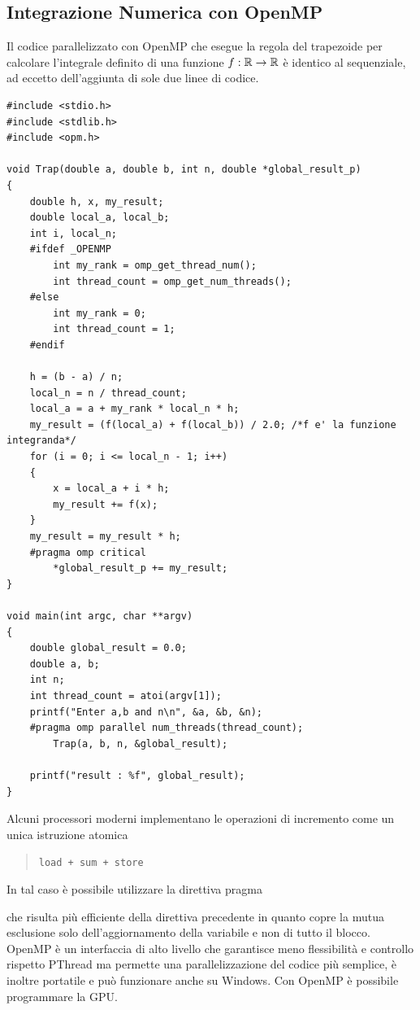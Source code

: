 \documentclass[10pt, letterpaper]{report}
\begin{document}
\subsection{Integrazione Numerica con OpenMP}
Il codice parallelizzato con OpenMP che esegue la regola del trapezoide per calcolare l'integrale definito di una funzione $f:{\mathbb R}\rightarrow {\mathbb R}$ è identico al sequenziale, ad eccetto dell'aggiunta di sole due linee di codice.
\begin{lstlisting}[style=CStyle]
#include <stdio.h>
#include <stdlib.h>
#include <opm.h>

void Trap(double a, double b, int n, double *global_result_p)
{
    double h, x, my_result;
    double local_a, local_b;
    int i, local_n;
    #ifdef _OPENMP
        int my_rank = omp_get_thread_num();
        int thread_count = omp_get_num_threads();
    #else
        int my_rank = 0;
        int thread_count = 1;
    #endif

    h = (b - a) / n;
    local_n = n / thread_count;
    local_a = a + my_rank * local_n * h;
    my_result = (f(local_a) + f(local_b)) / 2.0; /*f e' la funzione integranda*/
    for (i = 0; i <= local_n - 1; i++)
    {
        x = local_a + i * h;
        my_result += f(x);
    }
    my_result = my_result * h;
    #pragma omp critical
        *global_result_p += my_result;
}

void main(int argc, char **argv)
{
    double global_result = 0.0;
    double a, b;
    int n;
    int thread_count = atoi(argv[1]);
    printf("Enter a,b and n\n", &a, &b, &n);
    #pragma omp parallel num_threads(thread_count);
        Trap(a, b, n, &global_result);

    printf("result : %f", global_result);
}
\end{lstlisting}
Alcuni processori moderni implementano le operazioni di incremento come un unica istruzione atomica \begin{quote}
    \texttt{load + sum + store}
\end{quote}
In tal caso è possibile utilizzare la direttiva pragma \begin{quote}
\end{quote}
che risulta più efficiente della direttiva precedente in quanto copre la mutua esclusione solo dell'aggiornamento della variabile e non di tutto il blocco.\acc 
OpenMP è un interfaccia di alto livello che garantisce meno flessibilità e controllo rispetto PThread ma permette una parallelizzazione del codice più semplice, è inoltre portatile e può funzionare anche su Windows. Con OpenMP è possibile programmare la GPU.
\end{document}
